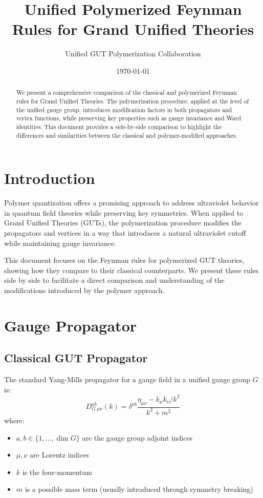 \documentclass[11pt]{article}
\title{Unified Polymerized Feynman Rules for Grand Unified Theories}
\author{Unified GUT Polymerization Collaboration}
\date{\today}
\begin{document}
\maketitle

\begin{abstract}
    We present a comprehensive comparison of the classical and polymerized Feynman rules for Grand Unified Theories. The polymerization procedure, applied at the level of the unified gauge group, introduces modification factors in both propagators and vertex functions, while preserving key properties such as gauge invariance and Ward identities. This document provides a side-by-side comparison to highlight the differences and similarities between the classical and polymer-modified approaches.
\end{abstract}

\section{Introduction}

Polymer quantization offers a promising approach to address ultraviolet behavior in quantum field theories while preserving key symmetries. When applied to Grand Unified Theories (GUTs), the polymerization procedure modifies the propagators and vertices in a way that introduces a natural ultraviolet cutoff while maintaining gauge invariance.

This document focuses on the Feynman rules for polymerized GUT theories, showing how they compare to their classical counterparts. We present these rules side by side to facilitate a direct comparison and understanding of the modifications introduced by the polymer approach.

\section{Gauge Propagator}

\subsection{Classical GUT Propagator}
The standard Yang-Mills propagator for a gauge field in a unified gauge group $G$ is:
\begin{equation}
    D_G^{ab}{}_{\mu\nu}(k) = \delta^{ab}\frac{\eta_{\mu\nu}-k_\mu k_\nu/k^2}{k^2 + m^2}
\end{equation}
where:
\begin{itemize}
    \item $a,b \in \{1,\ldots,\dim G\}$ are the gauge group adjoint indices
    \item $\mu,\nu$ are Lorentz indices
    \item $k$ is the four-momentum
    \item $m$ is a possible mass term (usually introduced through symmetry breaking)
\end{itemize}
\end{document}
